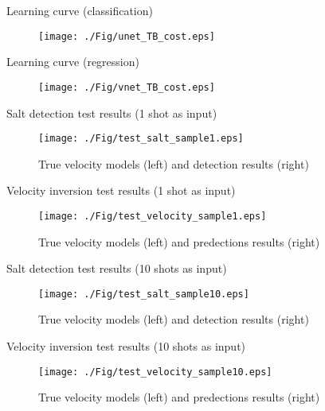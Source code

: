 \documentclass[aspectratio=169]{beamer}
\begin{document}
\begin{frame}{Learning curve (classification)}
\begin{figure}[ht]
\centering
    \texttt{[image: ./Fig/unet\_TB\_cost.eps]}
\end{figure}
\end{frame}
\begin{frame}{Learning curve (regression)}
\begin{figure}[ht]
    \centering
    \texttt{[image: ./Fig/vnet\_TB\_cost.eps]}
\end{figure}
\end{frame}
\begin{frame}{Salt detection test results (1 shot as input)}
    \center
    \begin{figure}
    \texttt{[image: ./Fig/test\_salt\_sample1.eps]}
    \caption{True velocity models (left) and detection results (right)}
    \end{figure}
\end{frame}
\begin{frame}{Velocity inversion test results (1 shot as input)}
    \center
    \begin{figure}
    \texttt{[image: ./Fig/test\_velocity\_sample1.eps]}
    \caption{True velocity models (left) and predections results (right)}
    \end{figure}
\end{frame}
\begin{frame}{Salt detection test results (10 shots as input)}
    \center
    \begin{figure}
    \texttt{[image: ./Fig/test\_salt\_sample10.eps]}
    \caption{True velocity models (left) and detection results (right)}
    \end{figure}
\end{frame}
\begin{frame}{Velocity inversion test results (10 shots as input)}
    \center
    \begin{figure}
    \texttt{[image: ./Fig/test\_velocity\_sample10.eps]}
    \caption{True velocity models (left) and predections results (right)}
    \end{figure}
\end{frame}
\end{document}
